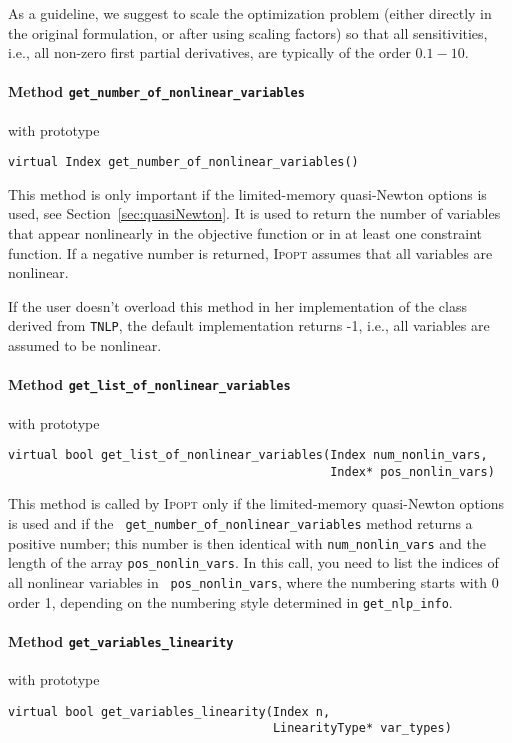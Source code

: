 \documentclass[10pt]{article}
\newcommand{\Ipopt}{\textsc{Ipopt}\xspace}
\begin{document}
As a guideline, we suggest to scale the optimization problem (either
directly in the original formulation, or after using scaling factors)
so that all sensitivities, i.e., all non-zero first partial
derivatives, are typically of the order $0.1-10$.

\paragraph{Method \texttt{get\_number\_of\_nonlinear\_variables}} with prototype
\begin{verbatim}
virtual Index get_number_of_nonlinear_variables()
\end{verbatim}

This method is only important if the limited-memory quasi-Newton
options is used, see Section~\ref{sec:quasiNewton}.  It is used
to return the number of variables that appear nonlinearly in the
objective function or in at least one constraint function.  If a
negative number is returned, \Ipopt assumes that all variables are
nonlinear.

If the user doesn't overload this method in her implementation of the
class derived from {\tt TNLP}, the default implementation returns -1,
i.e., all variables are assumed to be nonlinear.

\paragraph{Method \texttt{get\_list\_of\_nonlinear\_variables}} with prototype
\begin{verbatim}
virtual bool get_list_of_nonlinear_variables(Index num_nonlin_vars,
                                             Index* pos_nonlin_vars)
\end{verbatim}

This method is called by \Ipopt only if the limited-memory
quasi-Newton options is used and if the {\tt
  get\_number\_of\_nonlinear\_variables} method returns a positive
number; this number is then identical with {\tt num\_nonlin\_vars} and
the length of the array {\tt pos\_nonlin\_vars}.  In this call, you
need to list the indices of all nonlinear variables in {\tt
  pos\_nonlin\_vars}, where the numbering starts with 0 order 1,
depending on the numbering style determined in {\tt get\_nlp\_info}.

\paragraph{Method \texttt{get\_variables\_linearity}} with prototype
\begin{verbatim}
virtual bool get_variables_linearity(Index n,
                                     LinearityType* var_types)
\end{verbatim}
\end{document}
